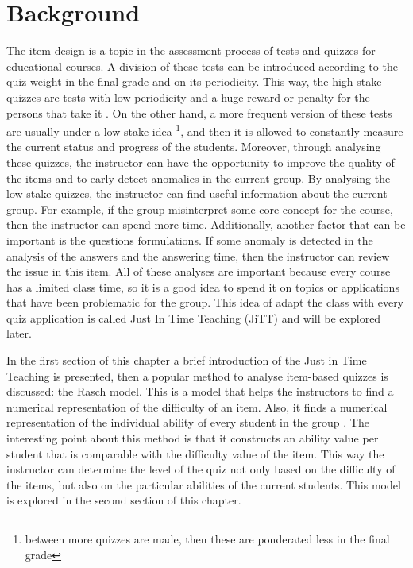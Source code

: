 \chapter{Background}

The item design is a topic in the assessment process of tests and quizzes for educational courses. A division of these tests can be introduced according to the quiz weight in the final grade and on its periodicity. This way, the high-stake quizzes are tests with low periodicity and a huge reward or penalty for the persons that take it \cite{salvador}. On the other hand, a more frequent version of these tests are usually under a low-stake idea \footnote{between more quizzes are made, then these are ponderated less in the final grade}, and then it is allowed to constantly measure the current status and progress of the students. Moreover, through analysing these quizzes, the instructor can have the opportunity to improve the quality of the items and to early detect anomalies in the current group. By analysing the low-stake quizzes, the instructor can find useful information about the current group. For example, if the group misinterpret some core concept for the course, then the instructor can spend more time. Additionally, another factor that can be important is the questions formulations. If some anomaly is detected in the analysis of the answers and the answering time, then the instructor can review the issue in this item. All of these analyses are important because every course has a limited class time, so it is a good idea to spend it on topics or applications that have been problematic for the group. This idea of adapt the class with every quiz application is called Just In Time Teaching (JiTT) \cite{jitt} and will be explored later.

In the first section of this chapter a brief introduction of the Just in Time Teaching is presented, then a popular method to analyse item-based quizzes is discussed: the Rasch model. This is a model that helps the instructors to find a numerical representation of the difficulty of an item. Also, it finds a numerical representation of the individual ability of every student in the group \cite{bond2015applying}. The interesting point about this method is that it constructs an ability value per student that is comparable with the difficulty value of the item. This way the instructor can determine the level of the quiz not only based on the difficulty of the items, but also on the particular abilities of the current students. This model is explored in the second section of this chapter. 

